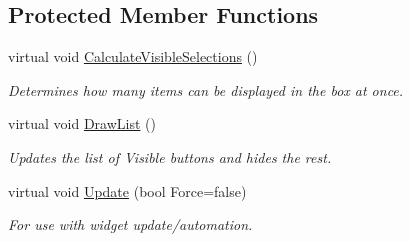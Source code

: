 \subsection*{Protected Member Functions}
\begin{DoxyCompactItemize}
\item 
\hypertarget{classphys_1_1UI_1_1ListBox_a8922aa7cdc3feb854a6c849b071fc8f6}{
virtual void \hyperlink{classphys_1_1UI_1_1ListBox_a8922aa7cdc3feb854a6c849b071fc8f6}{CalculateVisibleSelections} ()}
\label{d0/d28/classphys_1_1UI_1_1ListBox_a8922aa7cdc3feb854a6c849b071fc8f6}

\begin{DoxyCompactList}\small\item\em Determines how many items can be displayed in the box at once. \item\end{DoxyCompactList}\item 
\hypertarget{classphys_1_1UI_1_1ListBox_a4cc701e644aec861743ceff8bfc8793a}{
virtual void \hyperlink{classphys_1_1UI_1_1ListBox_a4cc701e644aec861743ceff8bfc8793a}{DrawList} ()}
\label{d0/d28/classphys_1_1UI_1_1ListBox_a4cc701e644aec861743ceff8bfc8793a}

\begin{DoxyCompactList}\small\item\em Updates the list of Visible buttons and hides the rest. \item\end{DoxyCompactList}\item 
\hypertarget{classphys_1_1UI_1_1ListBox_ac278c07a77081774369f76a4c7b12760}{
virtual void \hyperlink{classphys_1_1UI_1_1ListBox_ac278c07a77081774369f76a4c7b12760}{Update} (bool Force=false)}
\label{d0/d28/classphys_1_1UI_1_1ListBox_ac278c07a77081774369f76a4c7b12760}

\begin{DoxyCompactList}\small\item\em For use with widget update/automation. \item\end{DoxyCompactList}\end{DoxyCompactItemize}
